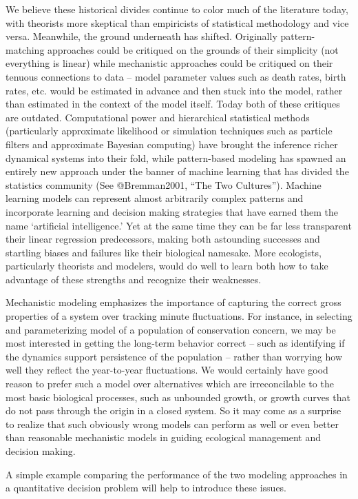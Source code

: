 \documentclass[author-year, review]{elsarticle} %
\begin{document}
We believe these historical divides continue to color much of the
literature today, with theorists more skeptical than empiricists of
statistical methodology and vice versa. Meanwhile, the ground underneath
has shifted. Originally pattern-matching approaches could be critiqued
on the grounds of their simplicity (not everything is linear) while
mechanistic approaches could be critiqued on their tenuous connections
to data -- model parameter values such as death rates, birth rates, etc.
would be estimated in advance and then stuck into the model, rather than
estimated in the context of the model itself. Today both of these
critiques are outdated. Computational power and hierarchical statistical
methods (particularly approximate likelihood or simulation techniques
such as particle filters and approximate Bayesian computing) have
brought the inference richer dynamical systems into their fold, while
pattern-based modeling has spawned an entirely new approach under the
banner of machine learning that has divided the statistics community
(See @Bremman2001, ``The Two Cultures''). Machine learning models can
represent almost arbitrarily complex patterns and incorporate learning
and decision making strategies that have earned them the name
`artificial intelligence.' Yet at the same time they can be far less
transparent their linear regression predecessors, making both astounding
successes and startling biases and failures like their biological
namesake. More ecologists, particularly theorists and modelers, would do
well to learn both how to take advantage of these strengths and
recognize their weaknesses.

Mechanistic modeling emphasizes the importance of capturing the correct
gross properties of a system over tracking minute fluctuations. For
instance, in selecting and parameterizing model of a population of
conservation concern, we may be most interested in getting the long-term
behavior correct -- such as identifying if the dynamics support
persistence of the population -- rather than worrying how well they
reflect the year-to-year fluctuations. We would certainly have good
reason to prefer such a model over alternatives which are irreconcilable
to the most basic biological processes, such as unbounded growth, or
growth curves that do not pass through the origin in a closed system. So
it may come as a surprise to realize that such obviously wrong models
can perform as well or even better than reasonable mechanistic models in
guiding ecological management and decision making.

A simple example comparing the performance of the two modeling
approaches in a quantitative decision problem will help to introduce
these issues.
\end{document}
